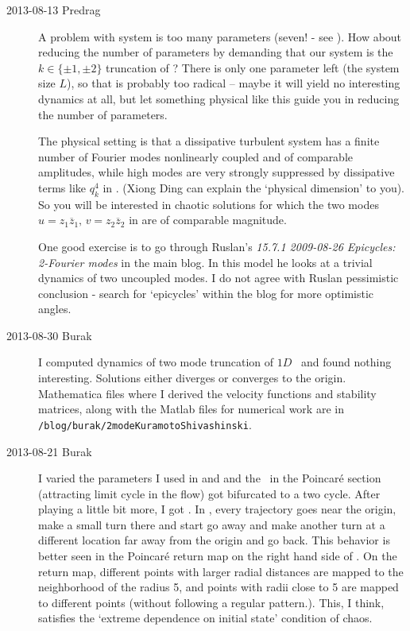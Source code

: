 \begin{description}

\item[2013-08-13 Predrag]
A problem with {\twoMode} system is too many parameters (seven! - see
). How about reducing the number of parameters by
demanding that our {\twoMode} system is the $k \in \{\pm 1,\pm 2\}$
truncation of \KS? There is only one parameter left (the system size
$L$), so that is probably too radical -- maybe it will
yield no interesting dynamics at all,
but let something physical like this guide you in reducing the number of
parameters.

The physical setting is that a dissipative turbulent system has a finite
number of Fourier modes nonlinearly coupled and of comparable amplitudes,
while high modes are very strongly suppressed by dissipative terms like
$q_k^4$ in . (Xiong Ding can explain the `physical
dimension' to you). So you will be interested in chaotic solutions for
which the two modes $u = {z}_1 \overline{z}_1,\, v = {z}_2
\overline{z}_2$ in  are of comparable magnitude.

One good exercise is to go through Ruslan's {\em 15.7.1 2009-08-26
Epicycles: 2-Fourier modes} in the  {main blog}.
In this model he looks at a trivial dynamics of two uncoupled modes. I do
not agree with Ruslan pessimistic conclusion - search for `epicycles'
within the blog for more optimistic angles.

\item[2013-08-30 Burak]
I computed dynamics of two mode truncation of $1D$ \KSe\ and found
nothing interesting. Solutions either diverges or converges to the
origin. Mathematica files where I derived the velocity functions and
stability matrices, along with the Matlab files for numerical work
are in
\\
\texttt{/blog/burak/2modeKuramotoShivashinski}.


\item[2013-08-21 Burak] I varied the parameters I used in  and  and
the \fixedpnt\ in the Poincar\'e section (attracting limit cycle in the flow) got bifurcated to a two cycle. After playing a little bit more, I got . In , every trajectory goes near the origin, make a small turn there and start go away and make another turn at a different location far away from the origin and go back. This behavior is better seen in the Poincar\'e return map on the right hand side of . On the return map, different points with larger radial distances are mapped to the neighborhood of the radius 5, and points with radii close to 5 are mapped to different points (without following a regular pattern.). This, I think, satisfies the `extreme dependence on initial state' condition of chaos.


\end{description}
